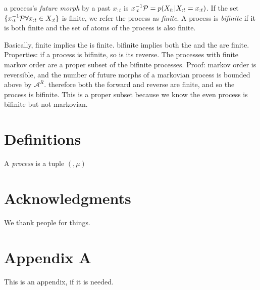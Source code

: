 \documentclass[prl,twocolumn,showpacs,superscriptaddress,preprintnumbers,floatfix]{revtex4-1}
\theoremstyle{plain}    \newtheorem{Lem}{Lemma}
\theoremstyle{plain}    \newtheorem*{ProLem}{Proof}
\theoremstyle{plain}    \newtheorem{Cor}{Corollary}
\theoremstyle{plain}    \newtheorem*{ProCor}{Proof}
\theoremstyle{plain}    \newtheorem{The}{Theorem}
\theoremstyle{plain}    \newtheorem*{ProThe}{Proof}
\theoremstyle{plain}    \newtheorem{Prop}{Proposition}
\theoremstyle{plain}    \newtheorem*{ProProp}{Proof}
\theoremstyle{plain}    \newtheorem*{Conj}{Conjecture}
\theoremstyle{plain}    \newtheorem*{Rem}{Remark}
\theoremstyle{plain}    \newtheorem{Def}{Definition}
\theoremstyle{plain}    \newtheorem*{Not}{Notation}
\begin{document}
a process's \emph{future morph} by a past $x_{:t}$ is $x_{:t}^{-1}\mathcal{P} =
p(X_{t:} | X_{:t} = x_{:t})$. If the set $\{ x_{:t}^{-1}\mathcal{P} \forall x_{:t}
\in X_{:t} \}$ is finite, we refer the process as \emph{finite}. A process is
\emph{bifinite} if it is both finite and the set of atoms of the process is also
finite.

Basically, finite implies the \eM is finite. bifinite implies both the
\eM and the \eT are finite. Properties: if a process is bifinite, so
is its reverse. The processes with finite markov order are a proper subset of
the bifinite processes. Proof: markov order is reversible, and the number of
future morphs of a markovian process is bounded above by $\mathcal{A}^R$.
therefore both the forward and reverse \eMs are finite, and so the
process is bifinite. This is a proper subset because we know the even process is
bifinite but not markovian.

\section{Definitions}
\label{sec:definitions}

A \emph{process} \Process is a tuple $(, \mu)$

\section*{Acknowledgments}
\label{sec:acknowledgments}

We thank people for things.



\cleardoublepage

\appendix

\section{Appendix A}
\label{sec:appendix_a}

This is an appendix, if it is needed.
\end{document}
